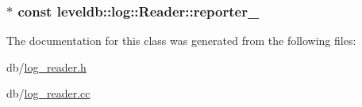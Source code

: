 \hypertarget{classleveldb_1_1log_1_1_reader_a1b678a3e93092d4c43a37e2042e7117f}{
\subsubsection[{reporter\-\_\-}]{$\ast$ const leveldb\-::log\-::\-Reader\-::reporter\-\_\-\hspace{0.3cm}{\ttfamily [private]}}}\label{classleveldb_1_1log_1_1_reader_a1b678a3e93092d4c43a37e2042e7117f}


The documentation for this class was generated from the following files\-:\begin{DoxyCompactItemize}
\item 
db/\hyperlink{log__reader_8h}{log\-\_\-reader.\-h}\item 
db/\hyperlink{log__reader_8cc}{log\-\_\-reader.\-cc}\end{DoxyCompactItemize}
